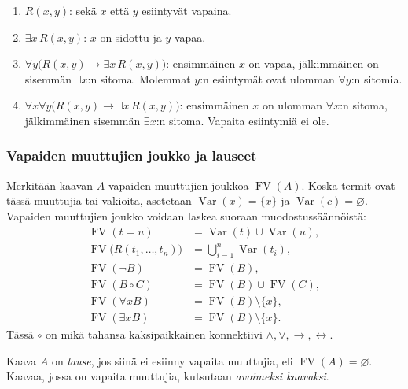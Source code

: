 \documentclass[11pt,a4paper]{amsart}
\begin{document}
\begin{example}
  \begin{enumerate}
    \item $R(x,y)$: sekä $x$ että $y$ esiintyvät vapaina.
    \item $\exists x\,R(x,y)$: $x$ on sidottu ja $y$ vapaa.
    \item $\forall y\bigl(R(x,y)\to\exists x\,R(x,y)\bigr)$:
      ensimmäinen $x$ on vapaa, jälkimmäinen on sisemmän $\exists x$:n
      sitoma. Molemmat $y$:n esiintymät ovat ulomman $\forall y$:n sitomia.
    \item $\forall x\forall y\bigl(R(x,y)\to\exists x\,R(x,y)\bigr)$:
      ensimmäinen $x$ on ulomman $\forall x$:n sitoma, jälkimmäinen
      sisemmän $\exists x$:n sitoma. Vapaita esiintymiä ei ole.
  \end{enumerate}
\end{example}

\clearpage
\subsubsection{Vapaiden muuttujien joukko ja lauseet}

Merkitään kaavan $A$ vapaiden muuttujien joukkoa
$\operatorname{FV}(A)$. Koska termit ovat tässä muuttujia tai vakioita,
asetetaan $\operatorname{Var}(x)=\{x\}$ ja
$\operatorname{Var}(c)=\varnothing$. Vapaiden muuttujien joukko
voidaan laskea suoraan muodostussäännöistä:
\begin{align*}
  \operatorname{FV}(t=u)
  &=\operatorname{Var}(t)\cup\operatorname{Var}(u),\\
  \operatorname{FV}\bigl(R(t_1,\ldots,t_n)\bigr)
  &=\bigcup_{i=1}^n\operatorname{Var}(t_i),\\
  \operatorname{FV}(\neg B)&=\operatorname{FV}(B),\\
  \operatorname{FV}(B\mathbin{\circ}C)
  &=\operatorname{FV}(B)\cup\operatorname{FV}(C),\\
  \operatorname{FV}(\forall xB)
  &=\operatorname{FV}(B)\setminus\{x\},\\
  \operatorname{FV}(\exists xB)
  &=\operatorname{FV}(B)\setminus\{x\}.
\end{align*}
Tässä $\circ$ on mikä tahansa kaksipaikkainen konnektiivi
$\land,\lor,\to,\leftrightarrow$.

\begin{definition}[Lause]
  Kaava $A$ on \emph{lause}, jos siinä ei esiinny vapaita muuttujia,
  eli $\operatorname{FV}(A)=\varnothing$. Kaavaa, jossa on vapaita
  muuttujia, kutsutaan \emph{avoimeksi kaavaksi}.
\end{definition}
\end{document}
